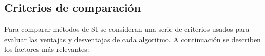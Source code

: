 %
%

\subsection{Criterios de comparación}

Para comparar métodos de SI se consideran una serie de criterios usados para evaluar las ventajas y desventajas de cada algoritmo. A continuación se describen los factores más relevantes:

